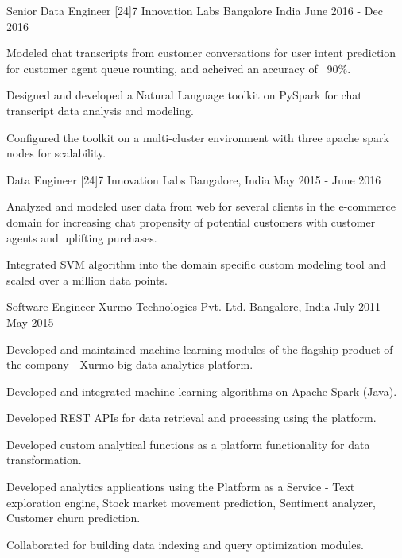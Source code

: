 \begin{cventries}
  \cventry
    {Senior Data Engineer}
    {[24]7 Innovation Labs}
    {Bangalore India}
    {June 2016 - Dec 2016}
    {
      \begin{cvitems}
        \item {Modeled chat transcripts from customer conversations for user intent prediction for customer agent queue rounting, and acheived an accuracy of ~90\%.}
        \item {Designed and developed a Natural Language toolkit on PySpark for chat transcript data analysis and modeling.}
        \item {Configured the toolkit on a multi-cluster environment with three apache spark nodes for scalability.}
      \end{cvitems}
    }
  \cventry
    {Data Engineer}
    {[24]7 Innovation Labs}
    {Bangalore, India}
    {May 2015 - June 2016}
    {
      \begin{cvitems}
        \item {Analyzed and modeled user data from web for several clients in the e-commerce domain for increasing chat propensity of potential customers with customer agents and uplifting purchases.}
        \item {Integrated SVM algorithm into the domain specific custom modeling tool and scaled over a million data points.}
      \end{cvitems}
    }
  \cventry
    {Software Engineer}
    {Xurmo Technologies Pvt. Ltd.}
    {Bangalore, India}
    {July 2011 - May 2015}
    {
      \begin{cvitems}
        \item {Developed and maintained machine learning modules of the flagship product of the company - Xurmo big data analytics platform.}
        \item {Developed and integrated machine learning algorithms on Apache Spark (Java).}
        \item {Developed REST APIs for data retrieval and processing using the platform.}
        \item {Developed custom analytical functions as a platform functionality for data transformation.}
        \item {Developed analytics applications using the Platform as a Service - Text exploration engine, Stock market movement prediction, Sentiment analyzer, Customer churn prediction.}
        \item {Collaborated for building data indexing and query optimization modules.}
      \end{cvitems} 
    }
\end{cventries}
